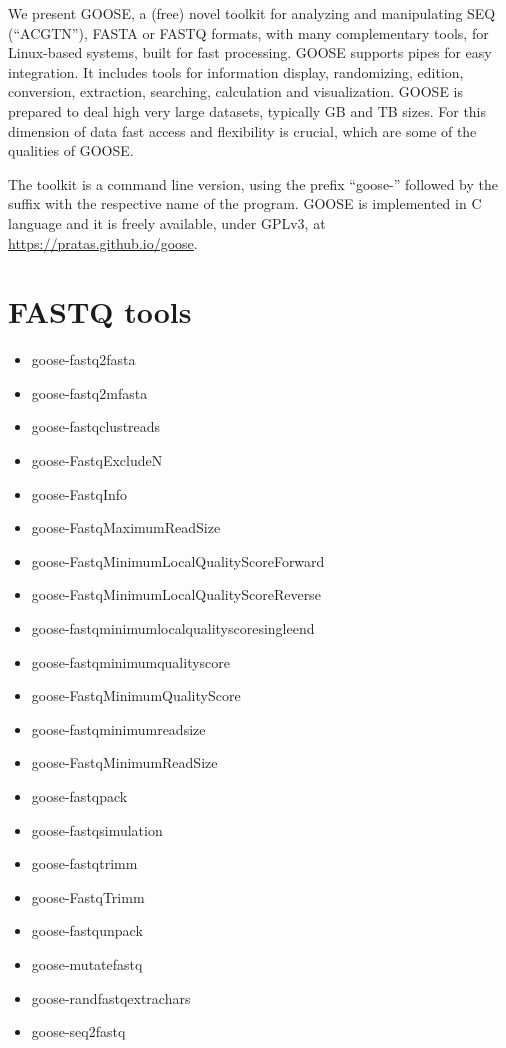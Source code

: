 \documentclass[11pt,journal,compsoc]{report}[1]
\begin{document}
We present GOOSE, a (free) novel toolkit for analyzing and manipulating
SEQ (``ACGTN''), FASTA or FASTQ formats, with many complementary tools,
for Linux-based systems, built for fast processing.
GOOSE supports pipes for easy integration. It includes tools for information 
display, randomizing, edition, conversion, extraction, searching,
calculation and visualization. GOOSE is prepared to deal high
very large datasets, typically GB and TB sizes. For this dimension of data
fast access and flexibility is crucial, which are some of the qualities of
GOOSE. 

The toolkit is a command line version, using the prefix ``goose-'' 
followed by the suffix with the respective name of the program.
GOOSE is implemented in C language and it is freely available, under GPLv3, 
at \url{https://pratas.github.io/goose}.


\chapter*{FASTQ tools}

\begin{itemize}
\item goose-fastq2fasta
\item goose-fastq2mfasta
\item goose-fastqclustreads
\item goose-FastqExcludeN
\item goose-FastqInfo
\item goose-FastqMaximumReadSize
\item goose-FastqMinimumLocalQualityScoreForward
\item goose-FastqMinimumLocalQualityScoreReverse
\item goose-fastqminimumlocalqualityscoresingleend
\item goose-fastqminimumqualityscore
\item goose-FastqMinimumQualityScore
\item goose-fastqminimumreadsize
\item goose-FastqMinimumReadSize
\item goose-fastqpack
\item goose-fastqsimulation
\item goose-fastqtrimm
\item goose-FastqTrimm
\item goose-fastqunpack
\item goose-mutatefastq
\item goose-randfastqextrachars
\item goose-seq2fastq
\end{itemize}
\end{document}
